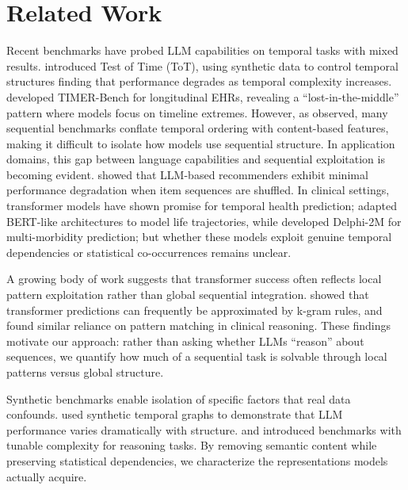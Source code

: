 \documentclass{article}
\theoremstyle{plain}
\theoremstyle{definition}
\theoremstyle{remark}
\begin{document}
\section{Related Work}
\label{sec:related_work}
Recent benchmarks have probed LLM capabilities on temporal tasks with mixed results. \citet{fatemiTESTTIMEBENCHMARK2025} introduced Test of Time (ToT), using synthetic data to control temporal structures finding that performance degrades as temporal complexity increases. \citet{cui2025timertemporalinstructionmodeling} developed TIMER-Bench for longitudinal EHRs, revealing a ``lost-in-the-middle'' pattern where models focus on timeline extremes. However, as \citet{klenitskiyDoesItLook2024} observed, many sequential benchmarks conflate temporal ordering with content-based features, making it difficult to isolate how models use sequential structure. In application domains, this gap between language capabilities and sequential exploitation is becoming evident. \citet{kimLostSequenceLarge2025b} showed that LLM-based recommenders exhibit minimal performance degradation when item sequences are shuffled. In clinical settings, transformer models have shown promise for temporal health prediction; \citet{savcisens2024using} adapted BERT-like architectures to model life trajectories, while \citet{delphi2025transformer} developed Delphi-2M for multi-morbidity prediction; but whether these models exploit genuine temporal dependencies or statistical co-occurrences remains unclear.

A growing body of work suggests that transformer success often reflects local pattern exploitation rather than global sequential integration. \citet{nguyen2024understanding} showed that transformer predictions can frequently be approximated by k-gram rules, and \citet{bediFidelityMedicalReasoning2025} found similar reliance on pattern matching in clinical reasoning. These findings motivate our approach: rather than asking whether LLMs ``reason'' about sequences, we quantify how much of a sequential task is solvable through local patterns versus global structure.

Synthetic benchmarks enable isolation of specific factors that real data confounds. \citet{fatemiTESTTIMEBENCHMARK2025} used synthetic temporal graphs to demonstrate that LLM performance varies dramatically with structure. \citet{kaiserCogniLoadSyntheticNatural2025} and \citet{ramezanaliSeqBenchTunableBenchmark2025} introduced benchmarks with tunable complexity for reasoning tasks. By removing semantic content while preserving statistical dependencies, we characterize the representations models actually acquire.
\end{document}
